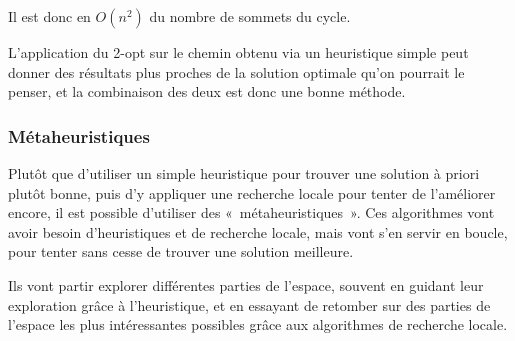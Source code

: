     Il est donc en $O(n^2)$ du nombre de sommets du cycle.

    L'application du 2-opt sur le chemin obtenu via un heuristique simple
    peut donner des résultats plus proches de la solution optimale qu'on
    pourrait le penser, et la combinaison des deux est donc une bonne méthode.

  \subsubsection{Métaheuristiques}

  Plutôt que d'utiliser un simple heuristique pour trouver une solution à priori plutôt
  bonne, puis d'y appliquer une recherche locale pour tenter de l'améliorer encore,
  il est possible d'utiliser des «~métaheuristiques~».
  Ces algorithmes vont avoir besoin d'heuristiques et de recherche locale, mais vont
  s'en servir en boucle, pour tenter sans cesse de trouver une solution meilleure.

  Ils vont partir explorer différentes parties de l'espace, souvent en guidant leur exploration
  grâce à l'heuristique, et en essayant de retomber sur des parties de l'espace les plus intéressantes
  possibles grâce aux algorithmes de recherche locale.


